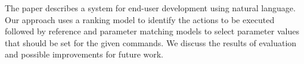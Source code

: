 The paper describes a system for end-user development using natural language. Our approach uses a ranking model to identify the actions to be executed followed by reference and parameter matching models to select parameter values that should be set for the given commands. We discuss the results of evaluation and possible improvements for future work.
